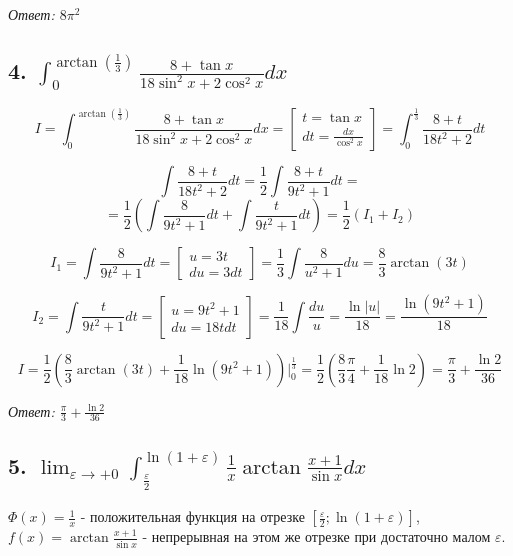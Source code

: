 \documentclass[a4paper]{article}
\begin{document}
\textit{Ответ: $8 \pi^2$}

\subsection*{4. $\displaystyle \int_0^{\arctan \left( \frac{1}{3} \right)} \frac{8+\tan x}{18 \sin^2 x + 2 \cos^2 x} dx$}

\[ 
I = \int_0^{\arctan \left( \frac{1}{3} \right)} \frac{8+\tan x}{18 \sin^2 x + 2 \cos^2 x} dx = \begin{bmatrix}
t = \tan x \\ dt = \frac{dx}{\cos^2 x}
\end{bmatrix} = \int_0^{\frac{1}{3}} \frac{8+t}{18t^2+2}dt \]

\[ \int \frac{8+t}{18t^2+2}dt = \frac{1}{2} \int \frac{8+t}{9t^2+1} dt = \]
 \[ =\frac{1}{2} \left( \int \frac{8}{9t^2+1} dt + \int \frac{t}{9t^2 + 1} dt \right) = \frac{1}{2} (I_1 + I_2)
\]

\[ I_1 =  \int \frac{8}{9t^2+1} dt = \begin{bmatrix}
u = 3t \\ du = 3dt
\end{bmatrix} = \frac{1}{3} \int \frac{8}{u^2+1} du = \frac{8}{3} \arctan(3t) \]

\[ I_2 =  \int \frac{t}{9t^2 + 1} dt = \begin{bmatrix}
u = 9t^2+1 \\ du = 18t dt
\end{bmatrix} = \frac{1}{18} \int \frac{du}{u} = \frac{\ln|u|}{18} = \frac{\ln(9t^2+1)}{18} \]

\[ I = \frac{1}{2} \left( \frac{8}{3} \arctan (3t) + \frac{1}{18} \ln (9t^2 + 1) \right) \bigg|_0^{\frac{1}{3}} = \frac{1}{2} \left( \frac{8}{3} \frac{\pi}{4} + \frac{1}{18} \ln 2 \right) = \frac{\pi}{3} + \frac{\ln 2}{36} \]

\textit{Ответ: $\frac{\pi}{3} + \frac{\ln 2}{36}$}


\subsection*{5. $\displaystyle \lim_{\varepsilon \rightarrow +0} \int_{\frac{\varepsilon}{2}}^{\ln (1+\varepsilon)} \frac{1}{x} \arctan \frac{x+1}{\sin x} dx$}

$\Phi(x) =\frac{1}{x}$ - положительная функция на отрезке $[\frac{\varepsilon}{2}; \ln (1+\varepsilon)]$,
$f(x) = \arctan \frac{x+1}{\sin x}$ - непрерывная на этом же отрезке при достаточно малом $\varepsilon$.
 
\end{document}
